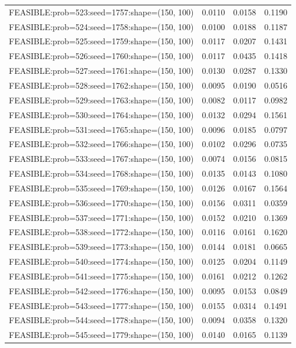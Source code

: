 \begin{longtable}{lccc}
FEASIBLE:prob=523:seed=1757:shape=(150, 100) & 0.0110 & 0.0158 & 0.1190 \\
FEASIBLE:prob=524:seed=1758:shape=(150, 100) & 0.0100 & 0.0188 & 0.1187 \\
FEASIBLE:prob=525:seed=1759:shape=(150, 100) & 0.0117 & 0.0207 & 0.1431 \\
FEASIBLE:prob=526:seed=1760:shape=(150, 100) & 0.0117 & 0.0435 & 0.1418 \\
FEASIBLE:prob=527:seed=1761:shape=(150, 100) & 0.0130 & 0.0287 & 0.1330 \\
FEASIBLE:prob=528:seed=1762:shape=(150, 100) & 0.0095 & 0.0190 & 0.0516 \\
FEASIBLE:prob=529:seed=1763:shape=(150, 100) & 0.0082 & 0.0117 & 0.0982 \\
FEASIBLE:prob=530:seed=1764:shape=(150, 100) & 0.0132 & 0.0294 & 0.1561 \\
FEASIBLE:prob=531:seed=1765:shape=(150, 100) & 0.0096 & 0.0185 & 0.0797 \\
FEASIBLE:prob=532:seed=1766:shape=(150, 100) & 0.0102 & 0.0296 & 0.0735 \\
FEASIBLE:prob=533:seed=1767:shape=(150, 100) & 0.0074 & 0.0156 & 0.0815 \\
FEASIBLE:prob=534:seed=1768:shape=(150, 100) & 0.0135 & 0.0143 & 0.1080 \\
FEASIBLE:prob=535:seed=1769:shape=(150, 100) & 0.0126 & 0.0167 & 0.1564 \\
FEASIBLE:prob=536:seed=1770:shape=(150, 100) & 0.0156 & 0.0311 & 0.0359 \\
FEASIBLE:prob=537:seed=1771:shape=(150, 100) & 0.0152 & 0.0210 & 0.1369 \\
FEASIBLE:prob=538:seed=1772:shape=(150, 100) & 0.0116 & 0.0161 & 0.1620 \\
FEASIBLE:prob=539:seed=1773:shape=(150, 100) & 0.0144 & 0.0181 & 0.0665 \\
FEASIBLE:prob=540:seed=1774:shape=(150, 100) & 0.0125 & 0.0204 & 0.1149 \\
FEASIBLE:prob=541:seed=1775:shape=(150, 100) & 0.0161 & 0.0212 & 0.1262 \\
FEASIBLE:prob=542:seed=1776:shape=(150, 100) & 0.0095 & 0.0153 & 0.0849 \\
FEASIBLE:prob=543:seed=1777:shape=(150, 100) & 0.0155 & 0.0314 & 0.1491 \\
FEASIBLE:prob=544:seed=1778:shape=(150, 100) & 0.0094 & 0.0358 & 0.1320 \\
FEASIBLE:prob=545:seed=1779:shape=(150, 100) & 0.0140 & 0.0165 & 0.1139 \\

\end{longtable}
